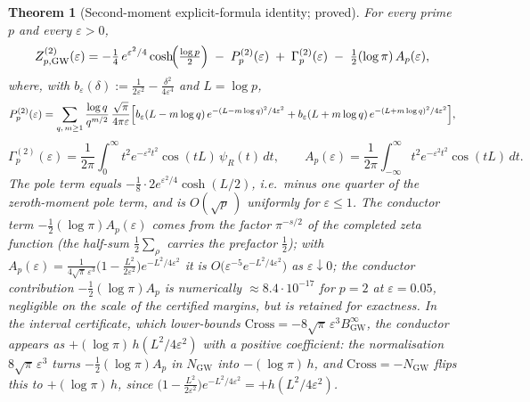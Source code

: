\documentclass[11pt]{article}
\newtheorem{theorem}{Theorem}[section]
\newcommand{\BinfGW}{B_{\mathrm{GW}}^{\infty}}   %
\newcommand{\ZtwoGW}{Z_{p,\mathrm{GW}}^{(2)}}   %
\newcommand{\Pp}{P_p^{(2)}}                 %
\newcommand{\Gp}{\Gamma_p^{(2)}}            %
\newcommand{\psiR}{\psi_{R}}                %
\begin{document}
\begin{theorem}[Second-moment explicit-formula identity; proved]
\label{thm:id}
For every prime $p$ and every $\varepsilon>0$,
\begin{equation}\label{eq:id}
\ZtwoGW(\varepsilon)
 = -\tfrac14\,e^{\varepsilon^2/4}\cosh\!\Bigl(\tfrac{\log p}{2}\Bigr)
   \;-\; \Pp(\varepsilon) \;+\; \Gp(\varepsilon)
   \;-\; \tfrac12(\log\pi)\,A_p(\varepsilon),
\end{equation}
where, with $b_\varepsilon(\delta):=\tfrac{1}{2\varepsilon^2}
-\tfrac{\delta^2}{4\varepsilon^4}$ and $L=\log p$,
\[
\Pp(\varepsilon)
 = \sum_{q,\,m\ge 1}\frac{\log q}{q^{m/2}}\,\frac{\sqrt\pi}{4\pi\varepsilon}
   \Bigl[b_\varepsilon(L-m\log q)\,e^{-(L-m\log q)^2/4\varepsilon^2}
       + b_\varepsilon(L+m\log q)\,e^{-(L+m\log q)^2/4\varepsilon^2}\Bigr],
\]
\[
\Gp(\varepsilon)
 = \frac{1}{2\pi}\int_0^\infty t^2 e^{-\varepsilon^2 t^2}\cos(t L)\,
   \psiR(t)\,dt,
\qquad
A_p(\varepsilon)
 = \frac{1}{2\pi}\int_{-\infty}^\infty t^2 e^{-\varepsilon^2 t^2}\cos(t L)\,dt .
\]
The pole term equals
$-\tfrac18\cdot 2e^{\varepsilon^2/4}\cosh(L/2)$, i.e.\ minus one quarter of
the zeroth-moment pole term, and is $O(\sqrt p\,)$ uniformly for
$\varepsilon\le 1$. The conductor term $-\tfrac12(\log\pi)A_p(\varepsilon)$ comes from
the factor $\pi^{-s/2}$ of the completed zeta function (the half-sum
$\tfrac12\sum_\rho$ carries the prefactor $\tfrac12$); with
$A_p(\varepsilon)=\tfrac{1}{4\sqrt\pi\,\varepsilon^3}
\bigl(1-\tfrac{L^2}{2\varepsilon^2}\bigr)e^{-L^2/4\varepsilon^2}$ it is
$O\!\bigl(\varepsilon^{-5}e^{-L^2/4\varepsilon^2}\bigr)$ as $\varepsilon\downarrow0$;
the conductor contribution $-\tfrac12(\log\pi)A_p$ is numerically
$\approx 8.4\cdot10^{-17}$ for $p=2$ at $\varepsilon=0.05$, negligible on the
scale of the certified margins, but is retained for exactness. In the interval
certificate, which lower-bounds $\mathrm{Cross}=-8\sqrt\pi\,\varepsilon^3\BinfGW$,
the conductor appears as $+(\log\pi)\,h(L^2/4\varepsilon^2)$ with a
\emph{positive} coefficient: the normalisation $8\sqrt\pi\,\varepsilon^3$ turns
$-\tfrac12(\log\pi)A_p$ in $N_{\mathrm{GW}}$ into $-(\log\pi)\,h$, and
$\mathrm{Cross}=-N_{\mathrm{GW}}$ flips this to $+(\log\pi)\,h$, since
$\bigl(1-\tfrac{L^2}{2\varepsilon^2}\bigr)e^{-L^2/4\varepsilon^2}=+h(L^2/4\varepsilon^2)$.
\end{theorem}
\end{document}
